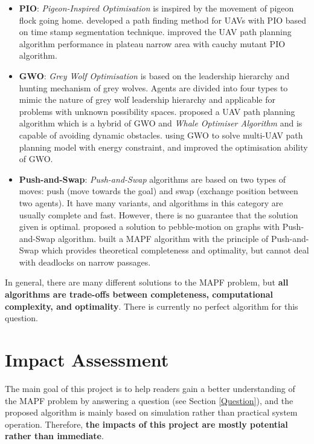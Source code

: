 \documentclass[12pt, oneside]{article}
\begin{document}
\begin{itemize}
\begin{itemize}
         \item \textbf{PIO}: \textit{Pigeon-Inspired Optimisation} is inspired by the movement of pigeon flock going home. \cite{PIO_1} developed a path finding method for UAVs with PIO based on time stamp segmentation technique. \cite{PIO_2} improved the UAV path planning algorithm performance in plateau narrow area with cauchy mutant PIO algorithm.
         \item \textbf{GWO}: \textit{Grey Wolf Optimisation}\cite{GWO} is based on the leadership hierarchy and hunting mechanism of grey wolves. Agents are divided into four types to mimic the nature of grey wolf leadership hierarchy and applicable for problems with unknown possibility spaces.\cite{GWO_1} proposed a UAV path planning algorithm which is a hybrid of GWO and \textit{Whale Optimiser Algorithm} and is capable of avoiding dynamic obstacles. \cite{GWO_2} using GWO to solve multi-UAV path planning model with energy constraint, and improved the optimisation ability of GWO.
         \item \textbf{Push-and-Swap}: \textit{Push-and-Swap} algorithms \cite{Push_and_Swap} are based on two types of moves: push (move towards the goal) and swap (exchange position between two agents). It have many variants, and algorithms in this category are usually complete and fast. However, there is no guarantee that the solution given is optimal.  \cite{PaS_1} proposed a solution to pebble-motion on graphs with Push-and-Swap algorithm. \cite{PaS_2} built a MAPF algorithm with the principle of Push-and-Swap which provides theoretical completeness and optimality, but cannot deal with deadlocks on narrow passages.
     \end{itemize}
\end{itemize}

In general, there are many different solutions to the MAPF problem, but \textbf{all algorithms are trade-offs between completeness, computational complexity, and optimality}. There is currently no perfect algorithm for this question.



\section{Impact Assessment}
The main goal of this project is to help readers gain a better understanding of the MAPF problem by answering a question (see Section \ref{Question}), and the proposed algorithm is mainly based on simulation rather than practical system operation. Therefore, \textbf{the impacts of this project are mostly potential rather than immediate}.
\end{document}
